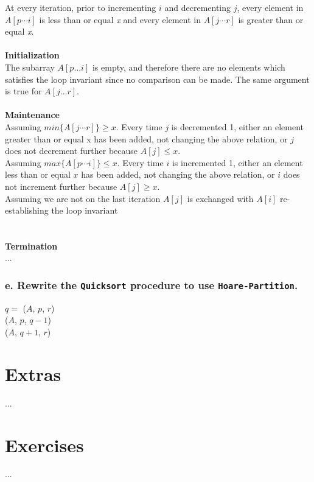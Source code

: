 \documentclass[11pt,english]{article}
\begin{document}
At every iteration, prior to incrementing $i$ and decrementing $j$, every 
element in $A[p \cdots i]$ is less than or equal \textit{x} and every 
element in $A[j \cdots r]$ is greater than or equal \textit{x}.
\\\\
\noindent \textbf{Initialization}\\
The subarray $A[p \dots i]$ is empty, and therefore there are no elements
which satisfies the loop invariant since no comparison can be made. The same
argument is true for $A[j \dots r]$.
\\\\
\noindent \textbf{Maintenance}\\
Assuming $min\{A[j \cdots r]\} \geq x$. Every time $j$ is decremented 1, 
either an element greater than or equal x has been added, not changing the 
above relation, or $j$ does not decrement further because $A[j] \leq x$. \\
Assuming $max\{A[p \cdots i]\} \leq x$. Every time $i$ is incremented 1, 
either an element less than or equal $x$ has been added, not changing the 
above relation, or $i$ does not increment further because $A[j] \geq x$. \\
Assuming we are not on the last iteration $A[j]$ is exchanged with $A[i]$ 
re-establishing the loop invariant\\
\\\\
\noindent \textbf{Termination}\\
...

\subsubsection*{\large e. \mdseries Rewrite the \texttt{Quicksort} procedure
to use \texttt{Hoare-Partition}.}
\begin{algorithm}
	
	\BlankLine
	
	{
		$q =$ \Hoare($A$, $p$, $r$) \\
		\Quicksort($A$, $p$, $q - 1$) \\
		\Quicksort($A$, $q + 1$, $r$)
	}
\end{algorithm}






\newpage
\section*{Extras}
...


\newpage
\pagestyle{fancy}

\section*{Exercises}
...
\end{document}
